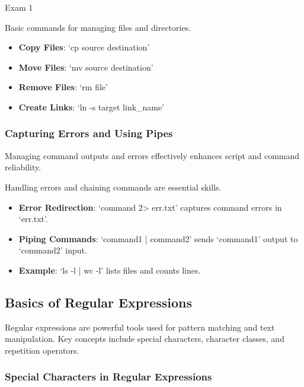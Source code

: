 \begin{examnotes}{Exam 1}
    \begin{highlight}
        Basic commands for managing files and directories.
        
        \begin{itemize}
            \item \textbf{Copy Files}: `cp source destination'
            \item \textbf{Move Files}: `mv source destination'
            \item \textbf{Remove Files}: `rm file'
            \item \textbf{Create Links}: `ln -s target link\_name'
        \end{itemize}
    \end{highlight}
    
    \subsubsection*{Capturing Errors and Using Pipes}
    
    Managing command outputs and errors effectively enhances script and command reliability.
    
    \begin{highlight}
        Handling errors and chaining commands are essential skills.
        
        \begin{itemize}
            \item \textbf{Error Redirection}: `command 2> err.txt' captures command errors in `err.txt'.
            \item \textbf{Piping Commands}: `command1 | command2' sends `command1' output to `command2' input.
            \item \textbf{Example}: `ls -l | wc -l' lists files and counts lines.
        \end{itemize}
    \end{highlight}

    \subsection*{Basics of Regular Expressions}

    Regular expressions are powerful tools used for pattern matching and text manipulation. Key concepts include special characters, character classes, and repetition operators.

    \subsubsection*{Special Characters in Regular Expressions}


\end{examnotes}
